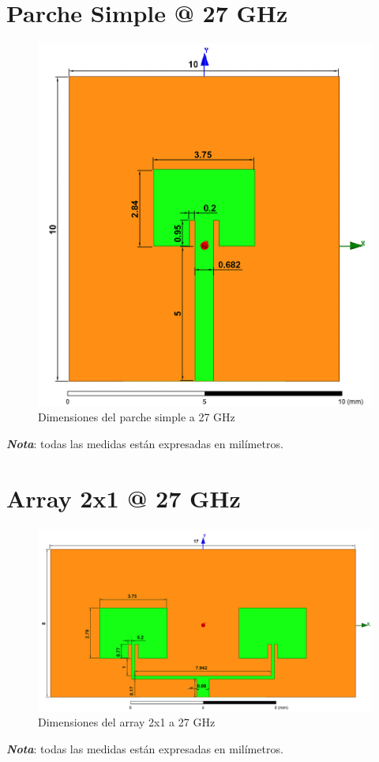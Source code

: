\section{Parche Simple @ 27 GHz}
\vfill
\begin{figure}[H]
   	 \centering
        \includegraphics[width=\textwidth ,height=\textheight, keepaspectratio=true]{archivos/desarrollo/autocad/12}
        \caption{Dimensiones del parche simple a 27 GHz}
        \label{fig:1x13}
\end{figure}
\vfill
\textit{\textbf{Nota}}: todas las medidas están expresadas en milímetros.

\section{Array 2x1 @ 27 GHz}
\vfill
\begin{figure}[H]
   	 \centering
        \includegraphics[width=\textwidth ,height=\textheight, keepaspectratio=true,angle=90,origin=c]{archivos/desarrollo/autocad/13}
        \caption{Dimensiones del array 2x1 a 27 GHz}
        \label{fig:2x13}
\end{figure}
\vfill
\textit{\textbf{Nota}}: todas las medidas están expresadas en milímetros.


